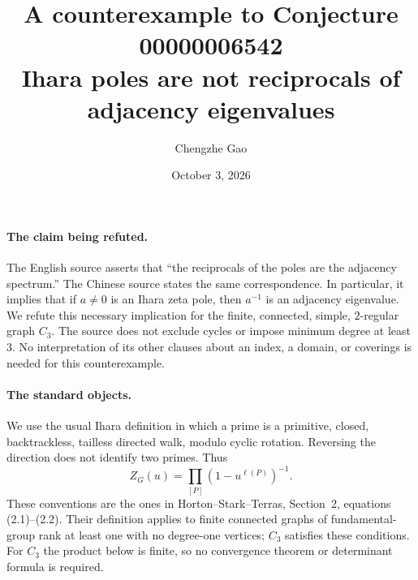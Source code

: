 \documentclass[10pt]{article}
\title{A counterexample to Conjecture 00000006542\\
\large Ihara poles are not reciprocals of adjacency eigenvalues}
\author{Chengzhe Gao}
\date{October 3, 2026}
\begin{document}
\maketitle

\paragraph{The claim being refuted.}
The English source asserts that ``the reciprocals of the poles are the
adjacency spectrum.'' The Chinese source states the same correspondence.
In particular, it implies that if $a\ne0$ is an Ihara zeta pole, then
$a^{-1}$ is an adjacency eigenvalue. We refute this necessary implication
for the finite, connected, simple, $2$-regular graph $C_3$. The source
does not exclude cycles or impose minimum degree at least $3$.
No interpretation of its other clauses about an index, a domain, or
coverings is needed for this counterexample.

\paragraph{The standard objects.}
We use the usual Ihara definition in which a prime is a primitive,
closed, backtrackless, tailless directed walk, modulo cyclic rotation.
Reversing the direction does not identify two primes. Thus
\[
 Z_G(u)=\prod_{[P]}(1-u^{\ell(P)})^{-1}.
\]
These conventions are the ones in Horton--Stark--Terras,
Section~2, equations (2.1)--(2.2)\cite{hst}. Their definition applies to
finite connected graphs of fundamental-group rank at least one with
no degree-one vertices; $C_3$ satisfies these conditions. For $C_3$ the
product below is finite, so no convergence theorem or determinant
formula is required.
\end{document}
